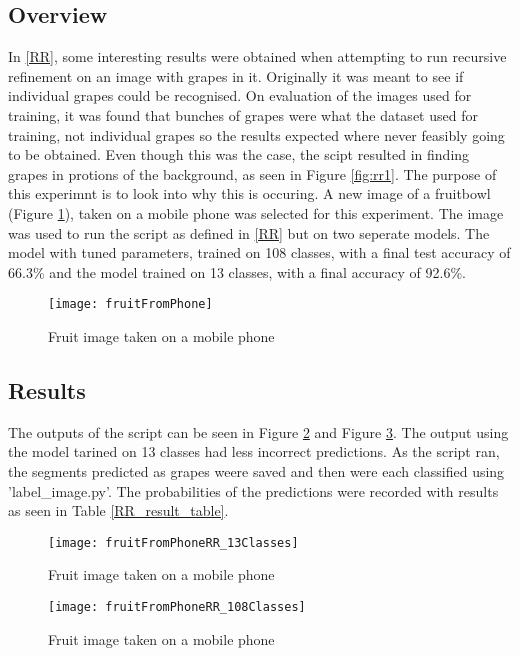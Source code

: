 \subsection*{Overview}
In \ref{RR}, some interesting results were obtained when attempting to run recursive refinement on an image with grapes in it.
Originally it was meant to see if individual grapes could be recognised.
On evaluation of the images used for training, it was found that bunches of grapes were what the dataset used for training, not individual grapes so the results expected where never feasibly going to be obtained.
Even though this was the case, the scipt resulted in finding grapes in protions of the background, as seen in Figure \ref{fig:rr1}.
The purpose of this experimnt is to look into why this is occuring.
A new image of a fruitbowl (Figure \ref{fig:fruitFromPhone}), taken on a mobile phone was selected for this experiment.
The image was used to run the script as defined in \ref{RR} but on two seperate models.
The model with tuned parameters, trained on 108 classes, with a final test accuracy of 66.3\% and the model trained on 13 classes, with a final accuracy of 92.6\%.

\begin{figure}
    \texttt{[image: fruitFromPhone]}
      \caption{Fruit image taken on a mobile phone}
      \label{fig:fruitFromPhone}
\end{figure}

\subsection*{Results}
The outputs of the script can be seen in Figure \ref{fig:fruitRR13} and Figure \ref{fig:fruitRR108}. The output using the model tarined on 13 classes had less incorrect predictions. As the script ran, the segments predicted as grapes weere saved and then were each classified using 'label\_image.py'. The probabilities of the predictions were recorded with results as seen in Table \ref{RR_result_table}.

\begin{figure}
    \texttt{[image: fruitFromPhoneRR\_13Classes]}
      \caption{Fruit image taken on a mobile phone}
      \label{fig:fruitRR13}
\end{figure}

\begin{figure}
    \texttt{[image: fruitFromPhoneRR\_108Classes]}
      \caption{Fruit image taken on a mobile phone}
      \label{fig:fruitRR108}
\end{figure}


